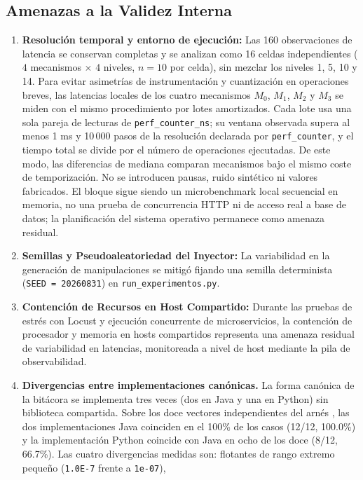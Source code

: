 \documentclass[11pt,a4paper]{article}
\begin{document}
\subsection{Amenazas a la Validez Interna}
\begin{enumerate}
  \item \textbf{Resoluci\'on temporal y entorno de ejecuci\'on:} Las 160 observaciones de latencia se conservan completas y se analizan como 16 celdas independientes ($4$ mecanismos $\times$ $4$ niveles, $n=10$ por celda), sin mezclar los niveles 1, 5, 10 y 14. Para evitar asimetr\'ias de instrumentaci\'on y cuantizaci\'on en operaciones breves, las latencias locales de los cuatro mecanismos $M_0$, $M_1$, $M_2$ y $M_3$ se miden con el mismo procedimiento por lotes amortizados. Cada lote usa una sola pareja de lecturas de \texttt{perf\_counter\_ns}; su ventana observada supera al menos 1 ms y 10\,000 pasos de la resoluci\'on declarada por \texttt{perf\_counter}, y el tiempo total se divide por el n\'umero de operaciones ejecutadas. De este modo, las diferencias de mediana comparan mecanismos bajo el mismo coste de temporizaci\'on. No se introducen pausas, ruido sint\'etico ni valores fabricados. El bloque sigue siendo un microbenchmark local secuencial en memoria, no una prueba de concurrencia HTTP ni de acceso real a base de datos; la planificaci\'on del sistema operativo permanece como amenaza residual.
  \item \textbf{Semillas y Pseudoaleatoriedad del Inyector:} La variabilidad en la generaci\'on de manipulaciones se mitig\'o fijando una semilla determinista (\texttt{SEED = 20260831}) en \texttt{run\_experimentos.py}.
  \item \textbf{Contenci\'on de Recursos en Host Compartido:} Durante las pruebas de estr\'es con Locust y ejecuci\'on concurrente de microservicios, la contenci\'on de procesador y memoria en hosts compartidos representa una amenaza residual de variabilidad en latencias, monitoreada a nivel de host mediante la pila de observabilidad.
  \item \textbf{Divergencias entre implementaciones can\'onicas.} La forma
can\'onica de la bit\'acora se implementa tres veces (dos en Java y una
en Python) sin biblioteca compartida. Sobre los doce vectores
independientes del arn\'es , las
dos implementaciones Java coinciden en el 100\% de los casos (12/12,
100.0\%) y la implementaci\'on Python coincide con Java en ocho de los
doce (8/12, 66.7\%). Las cuatro divergencias medidas son: flotantes de
rango extremo peque\~no (\texttt{1.0E-7} frente a \texttt{1e-07}),

\end{enumerate}
\end{document}
